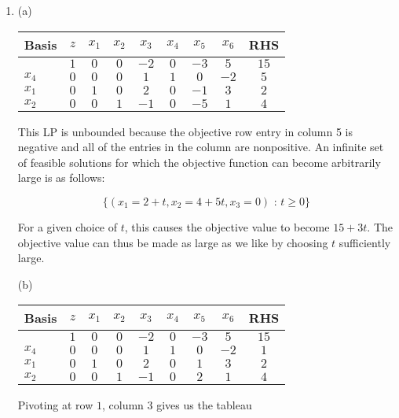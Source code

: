 \documentclass{article}[12pt,a4paper]
\begin{document}
\begin{enumerate}
  	\item
  	
  	(a)
		\begin{center}
 		\begin{tabular}{l | c | c c c c c c | c}
             		Basis & $z$ & $x_1$ & $x_2$ & $x_3$ & $x_4$ & $x_5$ & $x_6$ & RHS \\ \hline
  			     & $1$ & $0$ & $0$   & $-2$ & $0$  & $-3$     & $5$     & $15$  \\ \hline
  			$x_4$ & $0$ & $0$ & $0$   & $1$    & $1$      & $0$     & $-2$     & $5$ \\
  			$x_1$ & $0$ & $1$ & $0$  & $2$    & $0$      & $-1$     & $3$     & $2$ \\
  			$x_2$ & $0$ & $0$ & $1$ & $-1$    & $0$      & $-5$     & $1$     & $4$ \\
  		\end{tabular}
  		\end{center}

	This LP is unbounded because the objective row entry in column 5 is negative and all of the
	entries in the column are nonpositive. An infinite set of feasible solutions for which the objective
	function can become arbitrarily large is as follows:
	
	$$\{(x_1 = 2 + t, x_2 = 4 + 5t, x_3 = 0) \mbox{ : } t \ge 0\}$$
	
	For a given choice of $t$, this causes the objective value to become $15 + 3t$. The objective value can thus 
	be made as large as we like by choosing $t$ sufficiently large. \newline
	
	(b)
		\begin{center}
 		\begin{tabular}{l | c | c c c c c c | c}
             		Basis & $z$ & $x_1$ & $x_2$ & $x_3$ & $x_4$ & $x_5$ & $x_6$ & RHS \\ \hline
  			     & $1$ & $0$ & $0$   & $-2$ & $0$  & $-3$     & $5$     & $15$  \\ \hline
  			$x_4$ & $0$ & $0$ & $0$   & $1$    & $1$      & $0$     & $-2$     & $1$ \\
  			$x_1$ & $0$ & $1$ & $0$  & $2$    & $0$      & $1$     & $3$     & $2$ \\
  			$x_2$ & $0$ & $0$ & $1$ & $-1$    & $0$      & $2$     & $1$     & $4$ \\
  		\end{tabular}
  		\end{center}
  		
	Pivoting at row $1$, column $3$ gives us the tableau
	

\end{enumerate}
\end{document}
